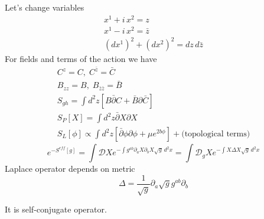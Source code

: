 \documentclass[a4paper,12pt]{article}
\theoremstyle{definition} \newtheorem{Def}{Definition}
\begin{document}
Let's change variables
\begin{equation}
  \label{eq:32}
  \begin{split}
    x^1+i\, x^2=z\\
    x^1-i\, x^2=\bar{z}\\
    (dx^1)^2+(dx^2)^2=dz\,d\bar{z}
  \end{split}
\end{equation}
For fields and terms of the action we have
\begin{equation}
  \label{eq:33}
  \begin{split}
    C^z=C,\; C^{\bar{z}}=\bar{C}\\
    B_{zz}=B, \; B_{\bar{z}\bar{z}}=\bar{B}\\
    S_{gh}=\int d^2z [B\bar{\partial}C+\bar{B}\partial \bar{C}]\\
    S_P[X]=\int d^2z \bar{\partial}X \partial X\\
    S_L[\phi] \propto \int d^2z \left[\bar{\partial} \phi \partial \phi+\mu e^{2 b \phi}\right] + \mbox{(topological terms)}
  \end{split}
\end{equation}
\begin{equation}
  \label{eq:34}
  e^{-S^{eff}[g]}=\int \mathcal{D} X e^{-\int g^{ab}\partial_a X \partial_b X \sqrt{g}\, d^2x} = \int \mathcal{D}_g X e^{-\int X \Delta X\sqrt{g}\, d^2x}
\end{equation}
Laplace operator depends on metric
\begin{equation}
  \label{eq:35}
  \Delta = \frac{1}{\sqrt{g}}\partial_a \sqrt{g} g^{ab}\partial_b
\end{equation}

It is self-conjugate operator.
\end{document}
